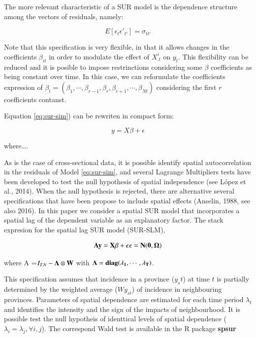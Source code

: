 \documentclass[]{elsarticle} %
\begin{document}
The more relevant characteristic of a SUR model is the dependence
structure among the vectors of residuals, namely:

\begin{equation}
\label{eq:sur-err}
E[\epsilon_t \epsilon'_{t'}]=\sigma_{tt'}
\end{equation}

Note that this specification is very flexible, in that it allows changes
in the coefficients \(\beta_{it}\) in order to modulate the effect of
\(X^i_{.t}\) on \(y_t\). This flexibility can be reduced and it is
posible to impose restrinctions considering some \(\beta\) coefficients
as being constant over time. In this case, we can reformulate the
coefficients expression of
\(\beta_t = (\beta_{1}, \cdots, \beta_{r-1}, \beta_{r}, \beta_{r+1}, \cdots, \beta_{Nt})\)
considering the first \(r\) coefficients contanst.

Equation \ref{eq:sur-sim}) can be rewriten in compact form:

\begin{equation}
y = X \beta + \epsilon
\end{equation}

\noindent where\ldots{}.

As is the case of cross-sectional data, it is possible identify spatial
autocorrelation in the residuals of Model \ref{eq:sur-sim}, and several
Lagrange Multipliers tests have been developed to test the null
hypothesis of spatial independence (see López et al., 2014). When the
null hypothesis is rejected, there are alternative several
specifications that have been propose to include spatial effects
(Anselin, 1988, see also 2016). In this paper we consider a spatial SUR
model that incorporates a spatial lag of the dependent variable as an
explanatory factor. The stack expresion for the spatial lag SUR model
(SUR-SLM),

\begin{equation}
\label{eq:sur-slm}
\bf{A}y = X \beta + \epsilon \\
\epsilon =N(0,\Omega)
\end{equation}

\noindent where A =\(I_{TN}-\bf{\Lambda} \otimes W\) with
\(\bf{\Lambda} = diag(\lambda_1, \cdots, \lambda_T)\).

This specification assumes that incidence in a province (\(y_st\)) at
time \(t\) is partially determined by the weighted average (\(Wy_{st}\))
of incidence in neighbouring provinces. Parameters of spatial dependence
are estimated for each time period \(\lambda_t\) and identifies the
intensity and the sign of the impacts of neighbourhood. It is possible
test the null hypotheis of identtical levels of spatial dependence
(\(\lambda_i=\lambda_j, \forall i,j\)). The correspond Wald test is
available in the R package \textbf{spsur}
\end{document}
